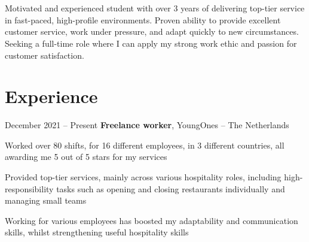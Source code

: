 



	\newcommand{\AND}{\unskip
		\cleaders\copy\ANDbox\hskip\wd\ANDbox
		\ignorespaces
	}
	\newsavebox\ANDbox
	\sbox\ANDbox{$|$}
	
	
	
	\vspace{-0.6cm}
	
	\section{}
	
	
	\begin{onecolentry}
		Motivated and experienced student with over 3 years of delivering top-tier service in fast-paced, high-profile environments. Proven ability to provide excellent customer service, work under pressure, and adapt quickly to new circumstances. Seeking a full-time role where I can apply my strong work ethic and passion for customer satisfaction.
	\end{onecolentry}
	
	\section{Experience}
	
	\begin{twocolentry}{
			December 2021 – Present
		}
		\textbf{Freelance worker}, YoungOnes -- The Netherlands
	\end{twocolentry}
	
	\vspace{0.10 cm}
	\begin{onecolentry}
		\begin{highlights}
			\item Worked over 80 shifts, for 16 different employees, in 3 different countries, all awarding me 5 out of 5 stars for my services
			\item Provided top-tier services, mainly across various hospitality roles, including high-responsibility tasks such as opening and closing restaurants individually and managing small teams
			\item Working for various employees has boosted my adaptability and communication skills, whilst strengthening useful hospitality skills
		\end{highlights}
	\end{onecolentry}
	
	\vspace{0.2 cm}
	
